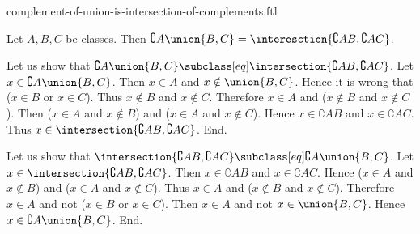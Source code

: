 \documentclass{article}
\begin{document}
\begin{smodule}[creators={Marcel Schütz}]{complement-of-union-is-intersection-of-complements.ftl}

  \begin{fproposition*}[label=718948240719872]
    Let $A, B, C$ be classes.
    Then $\complement{A}{\union{B,C}} = \interesction{\complement{A}{B},\complement{A}{C}}$.
  \end{fproposition*}
  \begin{fproof}
    Let us show that $\complement{A}{\union{B,C}} \subclass[eq] \intersection{\complement{A}{B},\complement{A}{C}}$.
      Let $x \in \complement{A}{\union{B,C}}$.
      Then $x \in A$ and $x \notin \union{B,C}$.
      Hence it is wrong that ($x \in B$ or $x \in C$).
      Thus $x \notin B$ and $x \notin C$.
      Therefore $x \in A$ and ($x \notin B$ and $x \notin C$).
      Then ($x \in A$ and $x \notin B$) and ($x \in A$ and $x \notin C$).
      Hence $x \in \complement{A}{B}$ and $x \in \complement{A}{C}$.
      Thus $x \in \intersection{\complement{A}{B},\complement{A}{C}}$.
    End.

    Let us show that $\intersection{\complement{A}{B},\complement{A}{C}} \subclass[eq] \complement{A}{\union{B,C}}$.
      Let $x \in \intersection{\complement{A}{B},\complement{A}{C}}$.
      Then $x \in \complement{A}{B}$ and $x \in \complement{A}{C}$.
      Hence ($x \in A$ and $x \notin B$) and ($x \in A$ and $x \notin C$).
      Thus $x \in A$ and ($x \notin B$ and $x \notin C$).
      Therefore $x \in A$ and not ($x \in B$ or $x \in C$).
      Then $x \in A$ and not $x \in \union{B,C}$.
      Hence $x \in \complement{A}{\union{B,C}}$.
    End.
  \end{fproof}
\end{smodule}
\end{document}
